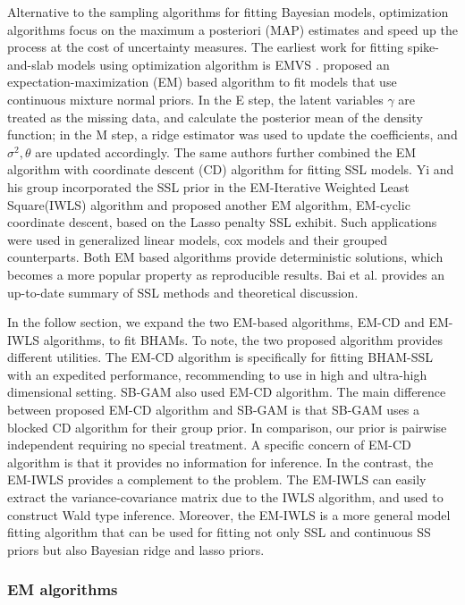 \documentclass[AMA,STIX1COL,]{WileyNJD-v2}
\begin{document}
Alternative to the sampling algorithms for fitting Bayesian models,
optimization algorithms focus on the maximum a posteriori (MAP)
estimates and speed up the process at the cost of uncertainty measures.
The earliest work for fitting spike-and-slab models using optimization
algorithm is EMVS \citep{Rockova2014a}. \citet{Rockova2014a} proposed an
expectation-maximization (EM) based algorithm to fit models that use
continuous mixture normal priors. In the E step, the latent variables
\(\gamma\) are treated as the missing data, and calculate the posterior
mean of the density function; in the M step, a ridge estimator was used
to update the coefficients, and \(\sigma^2, \theta\) are updated
accordingly. The same authors \citep{Rockova2018b, Rockova2018} further
combined the EM algorithm with coordinate descent (CD) algorithm for
fitting SSL models. Yi and his group incorporated the SSL prior in the
EM-Iterative Weighted Least Square(IWLS) algorithm and proposed another
EM algorithm, EM-cyclic coordinate descent, based on the Lasso penalty
SSL exhibit. Such applications were used in generalized linear
models\citep{Tang2017a}, cox models \citep{Tang2017} and their grouped
counterparts\citep{Tang2018, Tang2019}. Both EM based algorithms provide
deterministic solutions, which becomes a more popular property as
reproducible results. Bai et al. \citep{Bai2020} provides an up-to-date
summary of SSL methods and theoretical discussion.

In the follow section, we expand the two EM-based algorithms, EM-CD and
EM-IWLS algorithms, to fit BHAMs. To note, the two proposed algorithm
provides different utilities. The EM-CD algorithm is specifically for
fitting BHAM-SSL with an expedited performance, recommending to use in
high and ultra-high dimensional setting. SB-GAM\citep{Bai2020, Bai2021}
also used EM-CD algorithm. The main difference between proposed EM-CD
algorithm and SB-GAM is that SB-GAM uses a blocked CD algorithm for
their group prior. In comparison, our prior is pairwise independent
requiring no special treatment. A specific concern of EM-CD algorithm is
that it provides no information for inference. In the contrast, the
EM-IWLS provides a complement to the problem. The EM-IWLS can easily
extract the variance-covariance matrix due to the IWLS algorithm, and
used to construct Wald type inference. Moreover, the EM-IWLS is a more
general model fitting algorithm that can be used for fitting not only
SSL and continuous SS priors but also Bayesian ridge and lasso priors.

\hypertarget{em-algorithms}{%
\subsubsection{EM algorithms}\label{em-algorithms}}
\end{document}
